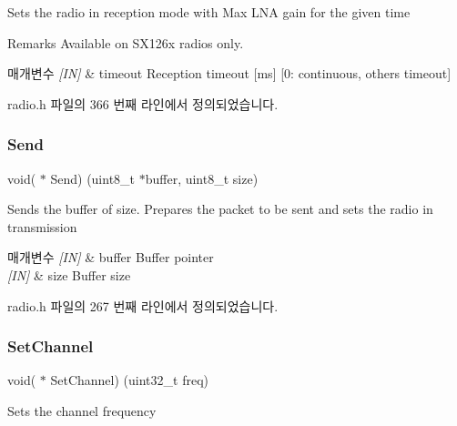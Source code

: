 Sets the radio in reception mode with Max L\+NA gain for the given time 

\begin{DoxyRemark}{Remarks}
Available on S\+X126x radios only.
\end{DoxyRemark}

\begin{DoxyParams}{매개변수}
{\em \mbox{[}\+I\+N\mbox{]}} & timeout Reception timeout \mbox{[}ms\mbox{]} \mbox{[}0\+: continuous, others timeout\mbox{]} \\
\hline
\end{DoxyParams}


radio.\+h 파일의 366 번째 라인에서 정의되었습니다.

\mbox{\label{struct_radio__s_a84c3ad8e921fef613c838563197adc6c}} 
\subsubsection{\texorpdfstring{Send}{Send}}
{\footnotesize\ttfamily void( $\ast$ Send) (uint8\+\_\+t $\ast$buffer, uint8\+\_\+t size)}



Sends the buffer of size. Prepares the packet to be sent and sets the radio in transmission 


\begin{DoxyParams}{매개변수}
{\em \mbox{[}\+I\+N\mbox{]}} & buffer Buffer pointer \\
\hline
{\em \mbox{[}\+I\+N\mbox{]}} & size Buffer size \\
\hline
\end{DoxyParams}


radio.\+h 파일의 267 번째 라인에서 정의되었습니다.

\mbox{\label{struct_radio__s_a691bfd16e5be0274cbfe0d7454749f12}} 
\subsubsection{\texorpdfstring{Set\+Channel}{SetChannel}}
{\footnotesize\ttfamily void( $\ast$ Set\+Channel) (uint32\+\_\+t freq)}



Sets the channel frequency 


